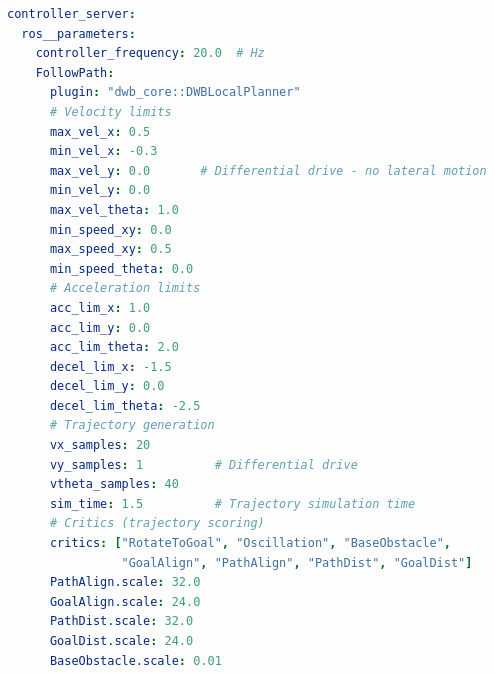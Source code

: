 \begin{lstlisting}[language=yaml, caption=nav2\_params.yaml (DWA section)]
controller_server:
  ros__parameters:
    controller_frequency: 20.0  # Hz
    FollowPath:
      plugin: "dwb_core::DWBLocalPlanner"
      # Velocity limits
      max_vel_x: 0.5
      min_vel_x: -0.3
      max_vel_y: 0.0       # Differential drive - no lateral motion
      min_vel_y: 0.0
      max_vel_theta: 1.0
      min_speed_xy: 0.0
      max_speed_xy: 0.5
      min_speed_theta: 0.0
      # Acceleration limits
      acc_lim_x: 1.0
      acc_lim_y: 0.0
      acc_lim_theta: 2.0
      decel_lim_x: -1.5
      decel_lim_y: 0.0
      decel_lim_theta: -2.5
      # Trajectory generation
      vx_samples: 20
      vy_samples: 1          # Differential drive
      vtheta_samples: 40
      sim_time: 1.5          # Trajectory simulation time
      # Critics (trajectory scoring)
      critics: ["RotateToGoal", "Oscillation", "BaseObstacle",
                "GoalAlign", "PathAlign", "PathDist", "GoalDist"]
      PathAlign.scale: 32.0
      GoalAlign.scale: 24.0
      PathDist.scale: 32.0
      GoalDist.scale: 24.0
      BaseObstacle.scale: 0.01
\end{lstlisting}
